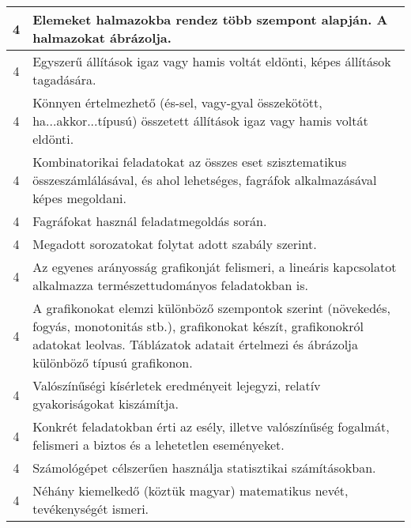 \begin{longtable}{c | p{} }
                                
                                          4 &  Elemeket halmazokba rendez több szempont alapján. A halmazokat ábrázolja. \\ \hline
                                          4 &  Egyszerű állítások igaz vagy hamis voltát eldönti, képes állítások tagadására. \\ \hline
                                          4 &  Könnyen értelmezhető (és-sel, vagy-gyal összekötött, ha...akkor...típusú) összetett állítások igaz vagy hamis voltát eldönti. \\ \hline
                                          4 &  Kombinatorikai feladatokat az összes eset szisztematikus összeszámlálásával, és ahol lehetséges, fagráfok alkalmazásával képes megoldani. \\ \hline
                                          4 &  Fagráfokat használ feladatmegoldás során. \\ \hline
                                          4 &  Megadott sorozatokat folytat adott szabály szerint. \\ \hline
                                          4 &  Az egyenes arányosság grafikonját felismeri, a lineáris kapcsolatot alkalmazza természettudományos feladatokban is. \\ \hline
                                          4 &  A grafikonokat elemzi különböző szempontok szerint (növekedés, fogyás, monotonitás stb.), grafikonokat készít, grafikonokról adatokat leolvas. Táblázatok adatait értelmezi és ábrázolja különböző típusú grafikonon. \\ \hline
                                          4 &  Valószínűségi kísérletek eredményeit lejegyzi, relatív gyakoriságokat kiszámítja. \\ \hline
                                          4 &  Konkrét feladatokban érti az esély, illetve valószínűség fogalmát, felismeri a biztos és a lehetetlen eseményeket. \\ \hline
                                          4 &  Számológépet célszerűen használja statisztikai számításokban. \\ \hline
                                          4 &  Néhány kiemelkedő (köztük magyar) matematikus nevét, tevékenységét ismeri. \\ \hline
                                      
                        \end{longtable}
            \clearpage

